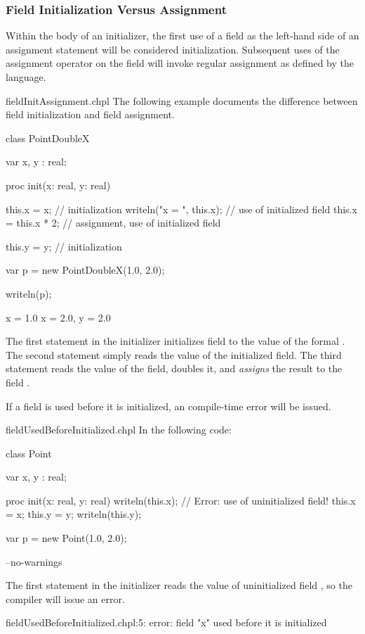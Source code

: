 \subsubsection{Field Initialization Versus Assignment}
\label{Field_Initialization_Versus_Assignment}

Within the body of an initializer, the first use of a field as the left-hand
side of an assignment statement will be considered initialization. Subsequent
uses of the assignment operator on the field will invoke regular assignment as
defined by the language.

\begin{chapelexample}{fieldInitAssignment.chpl}
The following example documents the difference between field initialization
and field assignment.
\begin{chapel}
class PointDoubleX {
  var x, y : real;

  proc init(x: real, y: real) {
    this.x = x;              // initialization
    writeln("x = ", this.x); // use of initialized field
    this.x = this.x * 2;     // assignment, use of initialized field

    this.y = y;              // initialization
  }
}

var p = new PointDoubleX(1.0, 2.0);
\end{chapel}
\begin{chapelpost}
writeln(p);
\end{chapelpost}
\begin{chapeloutput}
x = 1.0
{x = 2.0, y = 2.0}
\end{chapeloutput}
The first statement in the initializer initializes field  to the value
of the formal . The second statement simply reads the value of the
initialized field. The third statement reads the value of the field, doubles
it, and {\em assigns} the result to the field .
\end{chapelexample}

If a field is used before it is initialized, an compile-time error will be
issued.

\begin{chapelexample}{fieldUsedBeforeInitialized.chpl}
In the following code:
\begin{chapel}
class Point {
  var x, y : real;

  proc init(x: real, y: real) {
    writeln(this.x); // Error: use of uninitialized field!
    this.x = x;
    this.y = y;
    writeln(this.y);
  }
}
var p = new Point(1.0, 2.0);
\end{chapel}
\begin{chapelcompopts}
--no-warnings
\end{chapelcompopts}

The first statement in the initializer reads the value of uninitialized field
, so the compiler will issue an error.

\begin{chapelprintoutput}
fieldUsedBeforeInitialized.chpl:5: error: field "x" used before it is initialized
\end{chapelprintoutput}

\end{chapelexample}

